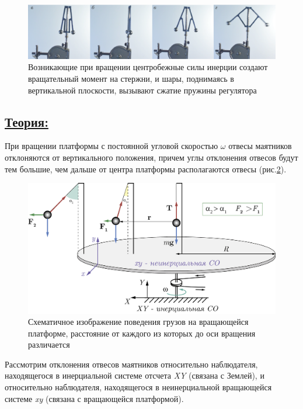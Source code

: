 \documentclass[14pt,a4paper,oneside]{extarticle}	%
\begin{document}
\begin{figure}[H] 
	\centering 		
	\includegraphics[width=0.9\linewidth]{regulator-1.png} 
	\caption{Возникающие при вращении центробежные силы инерции создают вращательный момент на стержни, и шары, поднимаясь в вертикальной плоскости, вызывают сжатие пружины регулятора}
	\label{regulator-1}
\end{figure}

\subsection*{\underline{Теория:}}

При вращении платформы с постоянной угловой скоростью $ \omega $ отвесы маятников отклоняются от вертикального положения, причем углы отклонения отвесов будут тем большие, чем дальше от центра платформы располагаются отвесы (рис.\ref{platform-3}).

\begin{figure}[H] 
	\centering 		
	\includegraphics[width=0.9\linewidth]{platform-3.png} 
	\caption{Схематичное изображение поведения грузов на вращающейся платформе, расстояние от каждого из которых до оси вращения различается}
	\label{platform-3}
\end{figure}

Рассмотрим отклонения отвесов маятников относительно наблюдателя, находящегося в инерциальной
системе отсчета \textit{XY} (связана с Землей), и относительно наблюдателя, находящегося в неинерциальной вращающейся системе \textit{xy} (связана с вращающейся платформой). 
\end{document}
